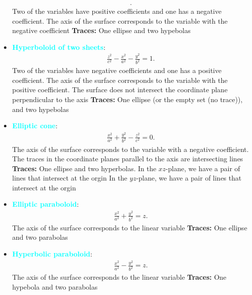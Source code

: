 \documentclass{report}
\begin{document}
\begin{itemize}
\begin{align*}
        .\end{align*}
        Two of the variables have positive coefficients and one has a negative coefficient. The axis of the surface corresponds to the variable with the negative coefficient
        \bigbreak \noindent 
        \bigbreak \noindent 
        \textbf{Traces:} One ellipse and two hypebolas
    \item \textbf{\textcolor{cyan}{Hyperboloid of two sheets}}:
        \begin{align*}
            \frac{z^{2}}{c^{2}} - \frac{x^{2}}{a^{2}} - \frac{y^{2}}{b^{2}} = 1
        .\end{align*}
        Two of the variables have negative coefficients and one has a positive coefficient. The axis of the surface corresponds to the variable with the positive coefficient. The surface does not intersect the coordinate plane perpendicular to the axis
        \bigbreak \noindent 
        \bigbreak \noindent 
        \textbf{Traces:} One ellipse (or the empty set (no trace)), and two hypebolas
    \item \textbf{\textcolor{cyan}{Elliptic cone}}:
        \begin{align*}
            \frac{x^{2}}{a^{2}} + \frac{y^{2}}{b^{2}} -\frac{z^{2}}{c^{2}} = 0
        .\end{align*}
        The axis of the surface corresponds to the variable with a negative coefficient. The traces in the coordinate planes parallel to the axis are intersecting lines
        \bigbreak \noindent 
        \bigbreak \noindent 
        \textbf{Traces:} One ellipse and two hyperbolas. 
        \smallbreak \noindent
        In the $xz$-plane, we have a pair of lines that intersect at the orgin
        \smallbreak \noindent
        In the $yz$-plane, we have a pair of lines that intersect at the orgin
    \item \textbf{\textcolor{cyan}{Elliptic paraboloid}}:
        \begin{align*}
            \frac{x^{2}}{a^{2} } + \frac{y^{2}}{b^{2}} = z
        .\end{align*}
        The axis of the surface corresponds to the linear variable
        \bigbreak \noindent 
        \bigbreak \noindent 
        \textbf{Traces:} One ellipse and two parabolas
    \item \textbf{\textcolor{cyan}{Hyperbolic paraboloid}}:
        \begin{align*}
            \frac{x^{2}}{a^{2} } - \frac{y^{2}}{b^{2}} = z
        .\end{align*}
        The axis of the surface corresponds to the linear variable
        \bigbreak \noindent 
        \bigbreak \noindent 
        \textbf{Traces:} One hypebola and two parabolas

    \end{itemize}
\end{document}
